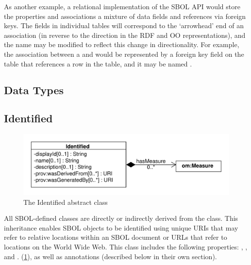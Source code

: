 As another example, a relational implementation of the SBOL API would store the properties and associations a mixture of data fields and references via foreign keys. The fields in individual tables will correspond to the `arrowhead' end of an association (in reverse to the direction in the RDF and OO representations), and the name may be modified to reflect this change in directionality. For example, the  association between a  and  would be represented by a foreign key field on the  table that references a row in the  table, and it may be named .

\subsection{Data Types}


\subsection {Identified}
\label{sec:Identified}

\begin{figure}[ht]
\begin{center}
\includegraphics[scale=0.6]{uml/identified}
\caption[]{The Identified abstract class}
\label{uml:identified}
\end{center}
\end{figure}

All SBOL-defined classes are directly or indirectly derived from the   class. This inheritance enables SBOL objects to be identified using unique URIs that may refer to relative locations within an SBOL document or URLs that refer to locations on the World Wide Web. This class includes the following properties: , , and .
(\ref{uml:identified}), as well as annotations (described below in their own section).

